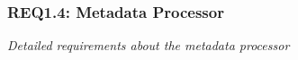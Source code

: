 \subsubsection{REQ1.4: Metadata Processor}

\textit{Detailed requirements about the metadata processor}
